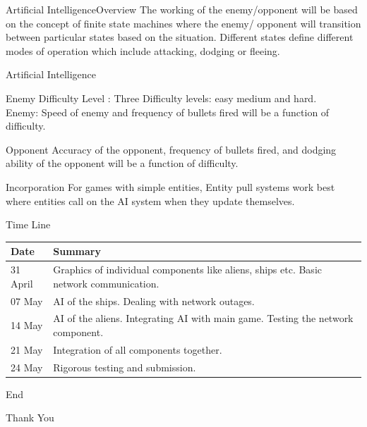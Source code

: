 \documentclass{beamer}
\begin{document}
\begin{frame}{Artificial Intelligence}{Overview}
  The working of the enemy/opponent will be based on the concept of finite state machines where the enemy/ opponent will transition between particular states based on the situation. Different states define different modes of operation which include attacking, dodging or fleeing.
\end{frame}

\begin{frame}{Artificial Intelligence}{}
	\begin{block}{Enemy}
  			Difficulty Level : Three Difficulty levels: easy medium and hard. \\
			Enemy: Speed of enemy and frequency of bullets fired will be a function of difficulty.
 	\end{block}
	\begin{block}{Opponent} 
  			Accuracy of the opponent, frequency of bullets fired, and dodging ability of the opponent will be a function of difficulty.
	\end{block}
	\begin{block}{Incorporation}
		For games with simple entities, Entity pull systems work best where entities call on the AI system when they update themselves.
	\end{block}
\end{frame}

\begin{frame}{Time Line}{}
	  \begin{center}
    \begin{tabular}{ | l | p{9cm} |}
    \hline
    Date &  Summary \\ \hline
    31 April & Graphics of individual components like aliens, ships etc. Basic network communication.\\ \hline
    07 May & AI of the ships. Dealing with network outages.\\ \hline
    14 May & AI of the aliens. Integrating AI with main game. Testing the network component. \\ \hline
    21 May & Integration of all components together. \\ \hline
    24 May & Rigorous testing and submission. \\ 
    \hline
    \end{tabular}
\end{center}
\end{frame}

\begin{frame}{End}
	\vfill
	\begin{center}
		\Huge{Thank You}
	\end{center}
	\vfill
\end{frame}
\end{document}
